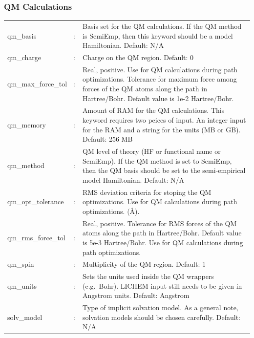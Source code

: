 \documentclass[12pt]{report}
\begin{document}
\subsubsection{QM Calculations}
\begin{center}
\begin{longtable}{ p{4cm} c p{12.5cm}}
qm\_basis & : & Basis set for the QM calculations.
If the QM method is SemiEmp, then this keyword should be a model Hamiltonian.
Default: N/A \newline\\

qm\_charge & : & Charge on the QM region.
Default: 0 \newline\\

qm\_max\_force\_tol & : & 
Real, positive. Use for QM calculations 
during path optimizations. 
Tolerance for maximum force among 
forces of the QM atoms 
along the path in Hartree/Bohr.  
Default value is 1e-2 Hartree/Bohr.\newline \\

qm\_memory & : & Amount of RAM for the QM calculations.
This keyword requires two peices of input.
An integer input for the RAM and a string for the units (MB or GB).
Default: 256 MB \newline\\

qm\_method & : & QM level of theory (HF or functional name or SemiEmp).
If the QM method is set to SemiEmp, then the QM basis should be set to the
semi-empirical model Hamiltonian.
Default: N/A \newline\\

qm\_opt\_tolerance & : & 
RMS deviation criteria for stoping the QM optimizations. 
Use for QM calculations 
during path optimizations.
(\AA).\newline\\

qm\_rms\_force\_tol & : & 
Real, positive. Tolerance for RMS forces of the QM atoms 
along the path in Hartree/Bohr. 
Default value is 5e-3 Hartree/Bohr. 
Use for QM calculations 
during path optimizations.\newline \\

qm\_spin & : & Multiplicity of the QM region.
Default: 1 \newline\\

qm\_units & : & Sets the units used inside the QM wrappers (e.g.\ Bohr).
LICHEM input still needs to be given in Angstrom units.
Default: Angstrom \newline\\

solv\_model & : & Type of implicit solvation model.
As a general note, solvation models should be chosen carefully.
Default: N/A 
\end{longtable}
\end{center}
\vspace{-48pt}
\end{document}
